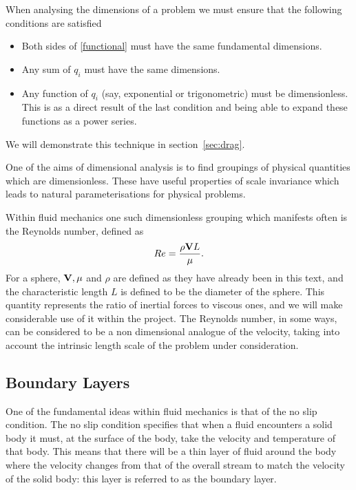 When analysing the dimensions of a problem we must ensure that the following conditions are
satisfied
\begin{itemize}
\item Both sides of \eqref{functional} must have the same fundamental dimensions.
\item Any sum of $q_i$ must have the same dimensions.
\item Any function of $q_i$ (say, exponential or trigonometric) must be dimensionless. This is as a 
direct result of the last condition and being able to expand these functions as a power series.
\end{itemize}

We will demonstrate this technique in section~\ref{sec:drag}.

One of the aims of dimensional analysis is to find groupings of physical quantities which are
dimensionless. These have useful properties of scale invariance which leads to natural parameterisations
for physical problems.

Within fluid mechanics one such dimensionless grouping which manifests often is the Reynolds
number, defined as 
\begin{equation} \label{re-number}
Re = \frac{\rho \mathbf{V} L}{\mu} .
\end{equation}
For a sphere, $\mathbf{V}, \mu$ and $\rho$ are defined as they have already been in this text, and the
characteristic length $L$ is defined to be the diameter of the sphere.
This quantity represents the ratio of inertial forces to viscous ones, and we will make considerable
use of it within the project. The Reynolds number, in some ways, can be considered to be a non
dimensional analogue of the velocity, taking into account the intrinsic length scale of the problem
under consideration.

\subsection{Boundary Layers}

One of the fundamental ideas within fluid mechanics is that of the no slip condition. The no slip 
condition specifies that when a fluid encounters a solid body it must, at the surface of the body,
take the velocity and temperature of that body. This means that there will be a thin layer of fluid
around the body where the velocity changes from that of the overall stream to match the velocity of
the solid body: this layer is referred to as the boundary layer.

